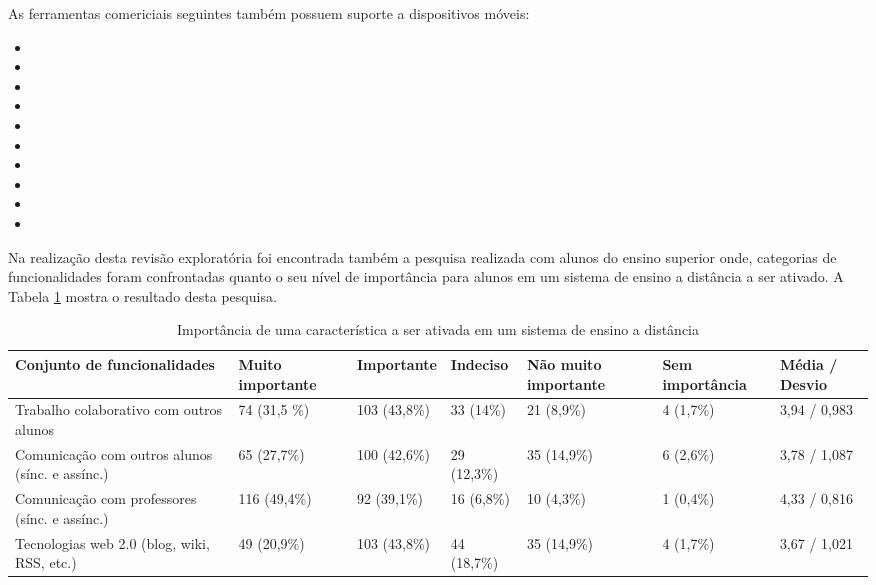 \noindent
As ferramentas comericiais seguintes também possuem suporte a dispositivos móveis:

\vspace{-5mm}
\begin{itemize}
    \item {}
    \item {}
    \item {}
    \item {}
    \item {}
    \item {}
    \item {}
    \item {}
    \item {}
    \item {}
\end{itemize}

Na realização desta revisão exploratória foi encontrada também a pesquisa \cite{pusnik_investigation_2010} realizada com alunos do ensino superior onde, categorias de funcionalidades foram confrontadas quanto o seu nível de importância para alunos em um sistema de ensino a distância a ser ativado. A Tabela \ref{tab:importancia} mostra o resultado desta pesquisa.
 
\bgroup
\def\arraystretch{1.1} %
\begin{table}[h]{} %
\centering
\small
\begin{tabular}{ | p{3cm}| p{2cm}| p{2cm}| p{1.8cm}| p{1.8cm}| p{1.5cm} | p{1.7cm}| } \hline
\textbf{Conjunto de funcionalidades} & \textbf{Muito importante} & \textbf{Importante} & \textbf{Indeciso} & \textbf{Não muito importante} & \textbf{Sem importância} & \textbf{Média / Desvio} \\ \hline
Trabalho colaborativo com outros alunos & 74 (31,5 \%) & 103 (43,8\%) & 33 (14\%) & 21 (8,9\%) & 4 (1,7\%) & 3,94 / 0,983 \\ \hline
Comunicação com outros alunos (sínc. e assínc.) & 65 (27,7\%) & 100 (42,6\%) & 29 (12,3\%) & 35 (14,9\%) & 6 (2,6\%) & 3,78 / 1,087 \\ \hline
Comunicação com professores (sínc. e assínc.) & 116 (49,4\%) & 92 (39,1\%) & 16 (6,8\%) & 10 (4,3\%) & 1 (0,4\%) & 4,33 / 0,816 \\ \hline
Tecnologias web 2.0 (blog, wiki, RSS, etc.) & 49 (20,9\%) & 103 (43,8\%) & 44 (18,7\%) & 35 (14,9\%) & 4 (1,7\%) & 3,67 / 1,021 \\ \hline
\end{tabular}
\caption{Importância de uma característica a ser ativada em um sistema de ensino a distância }
\label{tab:importancia}
\end{table}
\egroup

